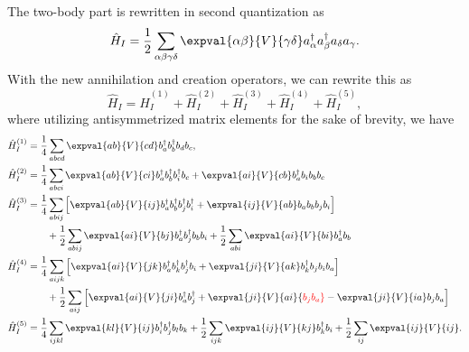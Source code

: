 The two-body part is rewritten in second quantization as
\begin{equation}
    \hat{H}_I = \frac{1}{2} \sum_{\alpha \beta \gamma \delta} \expval{\alpha \beta}{V}{\gamma \delta} a_\alpha^\dagger a_\beta^\dagger a_\delta a_\gamma.
\end{equation}
With the new annihilation and creation operators, we can rewrite this as
\begin{equation*}
    \hat{H}_I = \hat{H}_I^{(1)} + \hat{H}_I^{(2)} + \hat{H}_I^{(3)} + \hat{H}_I^{(4)} + \hat{H}_I^{(5)},
\end{equation*}
where utilizing antisymmetrized matrix elements for the sake of brevity, we have
\begin{align*}
    \hat{H}_I^{(1)} &= \frac{1}{4} \sum_{abcd} \expval{ab}{V}{cd} b_a^\dagger b_b^\dagger b_d b_c, \\
    \hat{H}_I^{(2)} &= \frac{1}{4} \sum_{abci} \expval{ab}{V}{ci} b_a^\dagger b_b^\dagger b_i^\dagger b_c + \expval{ai}{V}{cb} b_a^\dagger b_i b_b b_c \\
    \hat{H}_I^{(3)} &= \frac{1}{4} \sum_{abij} \left[\expval{ab}{V}{ij} b_a^\dagger b_b^\dagger b_j^\dagger b_i^\dagger + \expval{ij}{V}{ab} b_a b_b b_j b_i \right] \\
    &\qquad + \frac{1}{2} \sum_{abij} \expval{ai}{V}{bj} b_a^\dagger b_j^\dagger b_b b_i + \frac{1}{2} \sum_{abi} \expval{ai}{V}{bi} b_a^\dagger b_b \\
    \hat{H}_I^{(4)} &= \frac{1}{4} \sum_{aijk} \left[ \expval{ai}{V}{jk} b_a^\dagger b_k^\dagger b_j^\dagger b_i + \expval{ji}{V}{ak} b_k^\dagger b_j b_i b_a \right] \\
    &\qquad + \frac{1}{2} \sum_{aij} \left[ \expval{ai}{V}{ji} b_a^\dagger b_j^\dagger + \expval{ji}{V}{ai} {\color{red} b_j b_a} - \expval{ji}{V}{ia} b_j b_a \right] \\
    \hat{H}_I^{(5)} &= \frac{1}{4} \sum_{ijkl} \expval{kl}{V}{ij} b_i^\dagger b_j^\dagger b_l b_k + \frac{1}{2} \sum_{ijk} \expval{ij}{V}{kj} b_k^\dagger b_i + \frac{1}{2} \sum_{ij} \expval{ij}{V}{ij}.
\end{align*}

